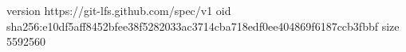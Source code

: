 version https://git-lfs.github.com/spec/v1
oid sha256:e10df5aff8452bfee38f5282033ac3714cba718edf0ee404869f6187ccb3fbbf
size 5592560
